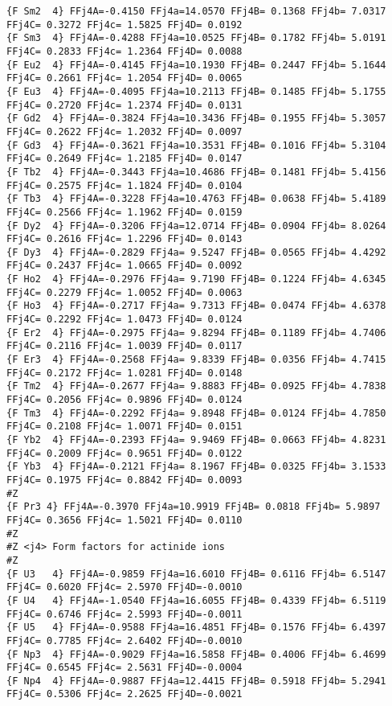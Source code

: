 {\begin{verbatim}
{F Sm2  4} FFj4A=-0.4150 FFj4a=14.0570 FFj4B= 0.1368 FFj4b= 7.0317 FFj4C= 0.3272 FFj4c= 1.5825 FFj4D= 0.0192 
{F Sm3  4} FFj4A=-0.4288 FFj4a=10.0525 FFj4B= 0.1782 FFj4b= 5.0191 FFj4C= 0.2833 FFj4c= 1.2364 FFj4D= 0.0088 
{F Eu2  4} FFj4A=-0.4145 FFj4a=10.1930 FFj4B= 0.2447 FFj4b= 5.1644 FFj4C= 0.2661 FFj4c= 1.2054 FFj4D= 0.0065 
{F Eu3  4} FFj4A=-0.4095 FFj4a=10.2113 FFj4B= 0.1485 FFj4b= 5.1755 FFj4C= 0.2720 FFj4c= 1.2374 FFj4D= 0.0131 
{F Gd2  4} FFj4A=-0.3824 FFj4a=10.3436 FFj4B= 0.1955 FFj4b= 5.3057 FFj4C= 0.2622 FFj4c= 1.2032 FFj4D= 0.0097 
{F Gd3  4} FFj4A=-0.3621 FFj4a=10.3531 FFj4B= 0.1016 FFj4b= 5.3104 FFj4C= 0.2649 FFj4c= 1.2185 FFj4D= 0.0147 
{F Tb2  4} FFj4A=-0.3443 FFj4a=10.4686 FFj4B= 0.1481 FFj4b= 5.4156 FFj4C= 0.2575 FFj4c= 1.1824 FFj4D= 0.0104 
{F Tb3  4} FFj4A=-0.3228 FFj4a=10.4763 FFj4B= 0.0638 FFj4b= 5.4189 FFj4C= 0.2566 FFj4c= 1.1962 FFj4D= 0.0159 
{F Dy2  4} FFj4A=-0.3206 FFj4a=12.0714 FFj4B= 0.0904 FFj4b= 8.0264 FFj4C= 0.2616 FFj4c= 1.2296 FFj4D= 0.0143 
{F Dy3  4} FFj4A=-0.2829 FFj4a= 9.5247 FFj4B= 0.0565 FFj4b= 4.4292 FFj4C= 0.2437 FFj4c= 1.0665 FFj4D= 0.0092 
{F Ho2  4} FFj4A=-0.2976 FFj4a= 9.7190 FFj4B= 0.1224 FFj4b= 4.6345 FFj4C= 0.2279 FFj4c= 1.0052 FFj4D= 0.0063 
{F Ho3  4} FFj4A=-0.2717 FFj4a= 9.7313 FFj4B= 0.0474 FFj4b= 4.6378 FFj4C= 0.2292 FFj4c= 1.0473 FFj4D= 0.0124 
{F Er2  4} FFj4A=-0.2975 FFj4a= 9.8294 FFj4B= 0.1189 FFj4b= 4.7406 FFj4C= 0.2116 FFj4c= 1.0039 FFj4D= 0.0117 
{F Er3  4} FFj4A=-0.2568 FFj4a= 9.8339 FFj4B= 0.0356 FFj4b= 4.7415 FFj4C= 0.2172 FFj4c= 1.0281 FFj4D= 0.0148 
{F Tm2  4} FFj4A=-0.2677 FFj4a= 9.8883 FFj4B= 0.0925 FFj4b= 4.7838 FFj4C= 0.2056 FFj4c= 0.9896 FFj4D= 0.0124 
{F Tm3  4} FFj4A=-0.2292 FFj4a= 9.8948 FFj4B= 0.0124 FFj4b= 4.7850 FFj4C= 0.2108 FFj4c= 1.0071 FFj4D= 0.0151 
{F Yb2  4} FFj4A=-0.2393 FFj4a= 9.9469 FFj4B= 0.0663 FFj4b= 4.8231 FFj4C= 0.2009 FFj4c= 0.9651 FFj4D= 0.0122 
{F Yb3  4} FFj4A=-0.2121 FFj4a= 8.1967 FFj4B= 0.0325 FFj4b= 3.1533 FFj4C= 0.1975 FFj4c= 0.8842 FFj4D= 0.0093 
#Z
{F Pr3 4} FFj4A=-0.3970 FFj4a=10.9919 FFj4B= 0.0818 FFj4b= 5.9897 FFj4C= 0.3656 FFj4c= 1.5021 FFj4D= 0.0110 
#Z
#Z <j4> Form factors for actinide ions
#Z
{F U3   4} FFj4A=-0.9859 FFj4a=16.6010 FFj4B= 0.6116 FFj4b= 6.5147 FFj4C= 0.6020 FFj4c= 2.5970 FFj4D=-0.0010 
{F U4   4} FFj4A=-1.0540 FFj4a=16.6055 FFj4B= 0.4339 FFj4b= 6.5119 FFj4C= 0.6746 FFj4c= 2.5993 FFj4D=-0.0011 
{F U5   4} FFj4A=-0.9588 FFj4a=16.4851 FFj4B= 0.1576 FFj4b= 6.4397 FFj4C= 0.7785 FFj4c= 2.6402 FFj4D=-0.0010 
{F Np3  4} FFj4A=-0.9029 FFj4a=16.5858 FFj4B= 0.4006 FFj4b= 6.4699 FFj4C= 0.6545 FFj4c= 2.5631 FFj4D=-0.0004 
{F Np4  4} FFj4A=-0.9887 FFj4a=12.4415 FFj4B= 0.5918 FFj4b= 5.2941 FFj4C= 0.5306 FFj4c= 2.2625 FFj4D=-0.0021 

\end{verbatim}}
